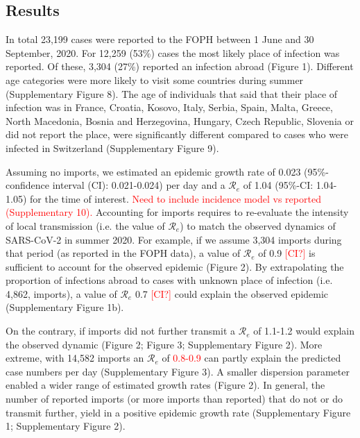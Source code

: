 \documentclass[10pt, a4paper, twoside]{article}
\begin{document}
\begin{multicols}{2}


\section{Results}
In total 23,199 cases were reported to the FOPH between 1 June and 30 September, 2020. 
For 12,259 (53\%) cases the most likely place of infection was reported.
Of these, 3,304 (27\%) reported an infection abroad (Figure 1). 
Different age categories were more likely to visit some countries during summer (Supplementary Figure 8). 
The age of individuals that said that their place of infection was in France, Croatia, Kosovo, Italy, Serbia, Spain, Malta, Greece, North Macedonia, Bosnia and Herzegovina, Hungary, Czech Republic, Slovenia  or did not report the place, were significantly different compared to cases who were infected in Switzerland (Supplementary Figure 9).

Assuming no imports, we estimated an epidemic growth rate of 0.023 (95\%-confidence interval (CI): 0.021-0.024) per day and a $\mathcal{R}_e$ of 1.04 (95\%-CI: 1.04-1.05) for the time of interest.
\textcolor{red}{Need to include incidence model vs reported (Supplementary 10).}
Accounting for imports requires to re-evaluate the intensity of local transmission (i.e. the value of $\mathcal{R}_e$) to match the observed dynamics of SARS-CoV-2 in summer 2020. 
For example, if we assume 3,304 imports during that period (as reported in the FOPH data), a value of $\mathcal{R}_e$ of 0.9 \textcolor{red}{[CI?]} is sufficient to account for the observed epidemic (Figure 2). 
By extrapolating the proportion of infections abroad to cases with unknown place of infection (i.e.  4,862, imports), a value of $\mathcal{R}_e$ 0.7 \textcolor{red}{[CI?]} could explain the observed epidemic (Supplementary Figure 1b). 

On the contrary, if imports did not further transmit a $\mathcal{R}_e$ of 1.1-1.2 would explain the observed dynamic (Figure 2; Figure 3; Supplementary Figure 2). 
More extreme, with 14,582 imports an $\mathcal{R}_e$ of \textcolor{red}{0.8-0.9} can partly explain the predicted case numbers per day (Supplementary Figure 3). 
A smaller dispersion parameter enabled a wider range of estimated growth rates (Figure 2). 
In general, the number of reported imports (or more imports than reported) that do not or do transmit further, yield in a positive epidemic growth rate (Supplementary Figure 1; Supplementary Figure 2).

\end{multicols}
\end{document}
